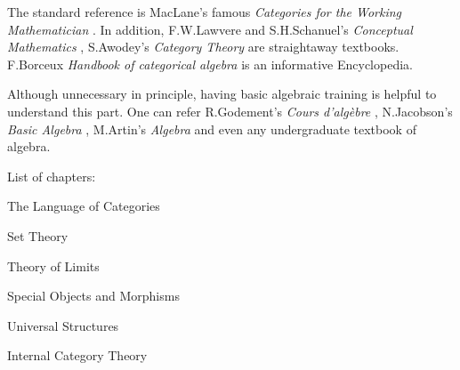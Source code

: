   The standard reference is MacLane's famous \emph{Categories for the Working Mathematician} \cite{lane1998categories}.
  In addition, F.W.Lawvere and S.H.Schanuel's \emph{Conceptual Mathematics} \cite{lawvere1997conceptual}, S.Awodey's \emph{Category Theory} \cite{awodey2010category} are straightaway textbooks.
  F.Borceux \emph{Handbook of categorical algebra} \cite{borceux} is an informative Encyclopedia.

  Although unnecessary in principle, having basic algebraic training is helpful to understand this part. One can refer
  R.Godement's \emph{Cours d'alg{\`e}bre} \cite{godement1963cours}, N.Jacobson's \emph{Basic Algebra} \cite{jacobson1980basic}, M.Artin's \emph{Algebra} \cite{artin2011algebra} and even any undergraduate textbook of algebra.

  List of chapters:

  The Language of Categories

  Set Theory

  Theory of Limits

  Special Objects and Morphisms

  Universal Structures

  Internal Category Theory

  
  
  
  



  
  



